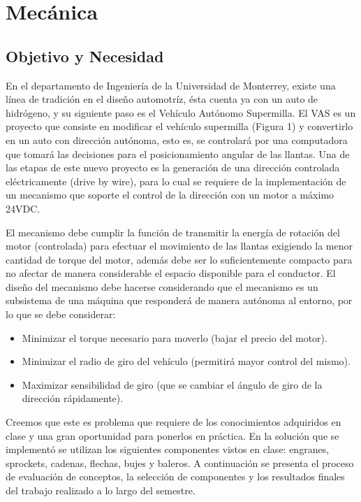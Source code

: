 \chapter{Mecánica}

\section{Objetivo y Necesidad}

En el departamento de Ingeniería de la Universidad de Monterrey, existe una línea de tradición en el diseño automotríz, ésta cuenta ya con un auto de hidrógeno, y su siguiente paso es el Vehículo Autónomo Supermilla. El VAS es un proyecto que consiste en modificar el vehículo supermilla (Figura 1) y convertirlo en un auto con dirección autónoma, esto es, se controlará por una computadora que tomará las decisiones para el posicionamiento angular de las llantas. Una de las etapas de este nuevo proyecto es la generación de una dirección controlada eléctricamente (drive by wire), para lo cual se requiere de la implementación de un mecanismo que soporte el control de la dirección con un motor a máximo 24VDC.









El mecanismo debe cumplir la función de transmitir la energía de rotación del motor (controlada) para efectuar el movimiento de las llantas exigiendo la menor cantidad de torque del motor, además debe ser lo suficientemente compacto para no afectar de manera considerable el espacio disponible para el conductor. El diseño del mecanismo debe hacerse considerando que el mecanismo es un subsistema de una máquina que responderá de manera autónoma al entorno, por lo que se debe considerar:

\begin{itemize}
\item Minimizar el torque necesario para moverlo (bajar el precio del motor).
\item Minimizar el radio de giro del vehículo (permitirá mayor control del mismo).
\item Maximizar sensibilidad de giro (que se cambiar el ángulo de giro de la dirección rápidamente).
\end{itemize}

Creemos que este es problema que requiere de los conocimientos adquiridos en clase y una gran oportunidad para ponerlos en práctica. En la solución que se implementó se utilizan los siguientes componentes vistos en clase: engranes, sprockets, cadenas, flechas, bujes y baleros. A continuación se presenta el proceso de evaluación de conceptos, la selección de componentes y los resultados finales del trabajo realizado a lo largo del semestre.

